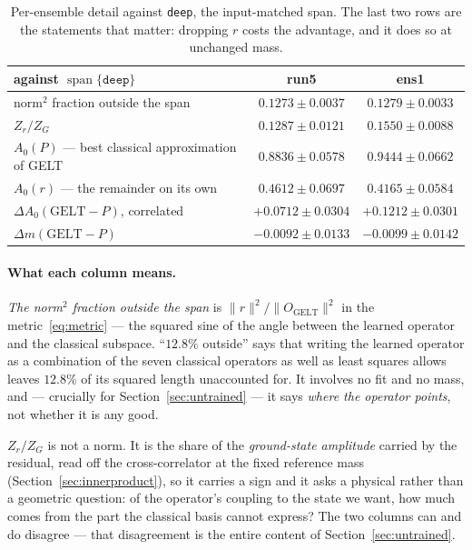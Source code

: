 \documentclass[11pt,a4paper]{article}
\newcommand{\Azero}{A_0}
\newcommand{\dAzero}{\Delta A_0}
\newcommand{\OG}{O_{\mathrm{GELT}}}
\newcommand{\spn}{\operatorname{span}}
\newcommand{\arm}[1]{\texttt{#1}}
\begin{document}
\begin{table}[htbp]
\centering\small
\caption{Per-ensemble detail against \arm{deep}, the input-matched span. The
last two rows are the statements that matter: dropping $r$ costs the advantage,
and it does so at unchanged mass.}
\label{tab:deep}
\begin{tabular}{@{}lcc@{}}
\toprule
against $\spn\{\arm{deep}\}$ & run5 & ens1 \\
\midrule
norm${}^2$ fraction outside the span & $0.1273 \pm 0.0037$ & $0.1279 \pm 0.0033$ \\
$Z_r/Z_G$                            & $0.1287 \pm 0.0121$ & $0.1550 \pm 0.0088$ \\
$\Azero(P)$ --- best classical approximation of GELT & $0.8836 \pm 0.0578$ & $0.9444 \pm 0.0662$ \\
$\Azero(r)$ --- the remainder on its own & $0.4612 \pm 0.0697$ & $0.4165 \pm 0.0584$ \\
$\dAzero(\text{GELT} - P)$, correlated & $+0.0712 \pm 0.0304$ & $+0.1212 \pm 0.0301$ \\
$\Delta m(\text{GELT} - P)$            & $-0.0092 \pm 0.0133$ & $-0.0099 \pm 0.0142$ \\
\bottomrule
\end{tabular}
\end{table}

\paragraph{What each column means.}

\emph{The norm${}^2$ fraction outside the span} is $\|r\|^2/\|\OG\|^2$ in the
metric~\eqref{eq:metric} --- the squared sine of the angle between the learned
operator and the classical subspace. ``$12.8\%$ outside'' says that writing the
learned operator as a combination of the seven classical operators as well as
least squares allows leaves $12.8\%$ of its squared length unaccounted for. It
involves no fit and no mass, and --- crucially for
Section~\ref{sec:untrained} --- it says \emph{where the operator points}, not
whether it is any good.

\emph{$Z_r/Z_G$} is not a norm. It is the share of the \emph{ground-state
amplitude} carried by the residual, read off the cross-correlator at the fixed
reference mass (Section~\ref{sec:innerproduct}), so it carries a sign and it
asks a physical rather than a geometric question: of the operator's coupling to
the state we want, how much comes from the part the classical basis cannot
express? The two columns can and do disagree --- that disagreement is the entire
content of Section~\ref{sec:untrained}.
\end{document}
